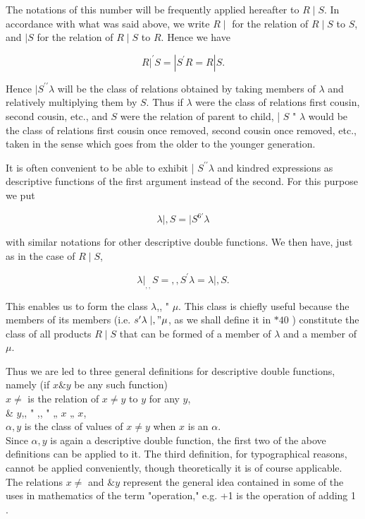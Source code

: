 \documentclass[10pt]{article}
\begin{document}
The notations of this number will be frequently applied hereafter to $R \mid S$. In accordance with what was said above, we write $R \mid$ for the relation of $R \mid S$ to $S$, and $\mid S$ for the relation of $R \mid S$ to $R$. Hence we have

$$
\left.R\right|^{\prime} S=\left|S^{\prime} R=R\right| S .
$$

Hence $\mid S^{\prime \prime} \lambda$ will be the class of relations obtained by taking members of $\lambda$ and relatively multiplying them by $S$. Thus if $\lambda$ were the class of relations first cousin, second cousin, etc., and $S$ were the relation of parent to child, | $S$ " $\lambda$ would be the class of relations first cousin once removed, second cousin once removed, etc., taken in the sense which goes from the older to the younger generation.

It is often convenient to be able to exhibit | $S^{\prime \prime} \lambda$ and kindred expressions as descriptive functions of the first argument instead of the second. For this purpose we put

$$
\lambda|, S=| S^{6 \prime} \lambda
$$

with similar notations for other descriptive double functions. We then have, just as in the case of $R \mid S$,

$$
\left.\lambda\right|_{,,} S=,, S^{\prime} \lambda=\lambda \mid, S .
$$

This enables us to form the class $\lambda$,, " $\mu$. This class is chiefly useful because the members of its members (i.e. $s^{\prime} \lambda \mid, " \mu$, as we shall define it in $* 40$ ) constitute the class of all products $R \mid S$ that can be formed of a member of $\lambda$ and a member of $\mu$.

Thus we are led to three general definitions for descriptive double functions, namely (if $x \& y$ be any such function)\\
$x \neq$ is the relation of $x \neq y$ to $y$ for any $y$,\\
\& $y$,, " ,, " „ $x$ „ $x$,\\
$\alpha, y$ is the class of values of $x \neq y$ when $x$ is an $\alpha$.\\
Since $\alpha, y$ is again a descriptive double function, the first two of the above definitions can be applied to it. The third definition, for typographical reasons, cannot be applied conveniently, though theoretically it is of course applicable. The relations $x \neq$ and $\& y$ represent the general idea contained in some of the uses in mathematics of the term "operation," e.g. +1 is the operation of adding 1 .
\end{document}
